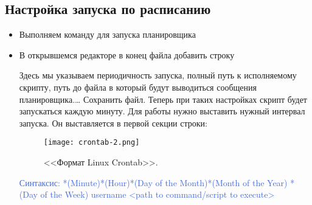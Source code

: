 \subsection{Настройка запуска по расписанию}

\begin{itemize}
	\item  Выполняем команду для запуска планировщика
	
%		
	
	\item В открывшемся редакторе в конец файла добавить строку
	

		
%		
	Здесь мы указываем периодичность запуска, полный путь к исполняемому скрипту, путь до файла в который будут выводиться сообщения планировщика.\ldots{}
	Сохранить файл. Теперь при таких настройках скрипт будет запускаться каждую минуту. Для работы нужно выставить нужный интервал запуска.	Он выставляется в первой секции строки:
	
	\begin{figure}[H]
		\texttt{[image: crontab-2.png]}
		\caption{<<Формат Linux Crontab>>.}
		\label{ris:crontab-2.png}
	\end{figure}
	
	\textcolor{RoyalBlue}{Синтаксис:
	*(Minute)*(Hour)*(Day of the Month)*(Month of the Year) *(Day of the Week) username <path to command/script to execute>}


	
	\begin{tabular}{|l|l|}
		

\end{tabular}
\end{itemize}
